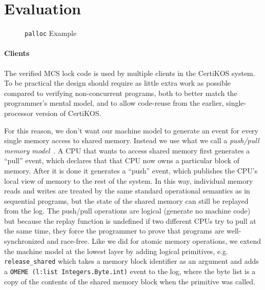 
\section{Evaluation}
\label{sec:evaluation}

\begin{figure}
\begin{minipage}{\linewidth}
\noindent
\begin{multicols}{2}


\end{multicols}
\end{minipage}
\caption{\lstinline$palloc$ Example}
\label{fig:palloc-example}
\end{figure}

\paragraph{Clients}
The verified MCS lock code is used by multiple clients in the CertiKOS
system. To be practical the design should require as little extra work
as possible compared to verifying non-concurrent programs, both to
better match the programmer's mental model, and to allow code-reuse
from the earlier, single-processor version of CertiKOS.

For this reason, we don't want our machine model to generate an event
for every single memory access to shared memory. Instead we use what
we call a \emph{push/pull memory model}~\cite{certikos16,ccal16}. A
CPU that wants to access shared memory first generates a ``pull''
event, which declares that that CPU now owns a particular block of
memory. After it is done it generates a ``push'' event, which
publishes the CPU's local view of memory to the rest of the system. In
this way, individual memory reads and writes are treated by the same
standard operational semantics as in sequential programs, but the
state of the shared memory can still be replayed from the log.  The
push/pull operations are logical (generate no machine code) but
because the replay function is undefined if two different CPUs try to
pull at the same time, they force the programmer to prove that
programs are well-synchronized and race-free. Like we did for atomic
memory operations, we extend the machine model at the lowest layer by
adding logical primitives, e.g. \lstinline$release_shared$ which takes a
memory block identifier as an argument and adds a
\lstinline$OMEME (l:list Integers.Byte.int)$ event to the log, where the byte list is a
copy of the contents of the shared memory block when the primitive was
called.

